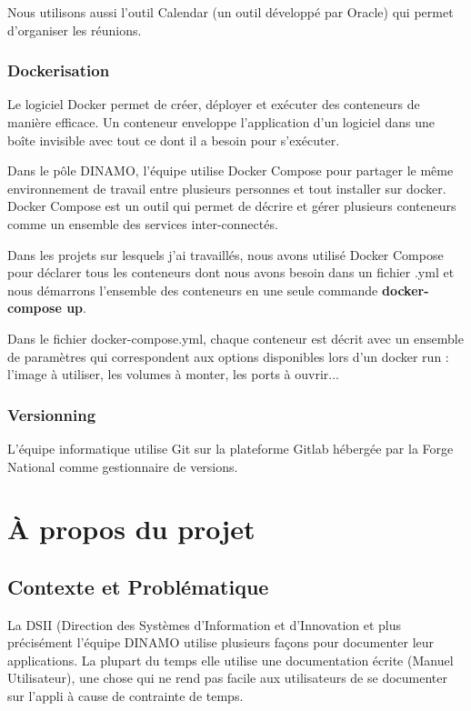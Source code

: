 \documentclass[12pt]{article}
\begin{document}
Nous utilisons aussi l'outil Calendar (un outil développé par Oracle) qui permet d’organiser les réunions.  

\subsubsection{Dockerisation}

Le logiciel Docker permet de créer, déployer et exécuter des conteneurs de manière efficace. Un conteneur enveloppe l’application d’un logiciel dans une boîte invisible avec tout ce dont il a besoin pour s’exécuter.


Dans le pôle DINAMO, l'équipe utilise Docker Compose pour partager le même environnement de travail entre plusieurs personnes et tout installer sur docker. Docker Compose est un outil qui permet de décrire et gérer  plusieurs conteneurs comme un ensemble des services inter-connectés.

Dans les projets sur lesquels j'ai travaillés, nous avons utilisé Docker Compose pour déclarer tous les conteneurs dont nous avons besoin dans un fichier .yml  et nous démarrons l'ensemble des conteneurs en une seule commande \textbf{docker-compose up}. 

Dans le fichier docker-compose.yml, chaque conteneur est décrit avec un ensemble de paramètres qui correspondent aux options disponibles lors d’un docker run : l’image à utiliser, les volumes à monter, les ports à ouvrir...
 

\subsubsection{Versionning}

L'équipe informatique utilise Git sur la plateforme Gitlab hébergée par la Forge National comme gestionnaire de versions. 

\section{À propos du projet}

\subsection{Contexte et Problématique}

La DSII (Direction des Systèmes d'Information et d'Innovation et plus précisément l'équipe DINAMO utilise plusieurs façons pour documenter leur applications. La plupart du temps elle utilise une documentation écrite (Manuel Utilisateur), une chose qui ne rend pas facile aux utilisateurs de se documenter sur l'appli à cause de contrainte de temps. 
\end{document}
